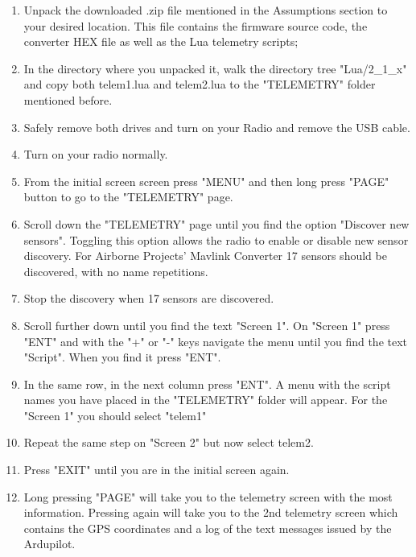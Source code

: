 \documentclass[english]{article}
\begin{document}
\begin{enumerate}
\item  Unpack the downloaded .zip file mentioned in the Assumptions section to your desired location. This file contains the firmware source code, the converter HEX file as well as the Lua telemetry scripts;

\item In the directory where you unpacked it, walk the directory tree "Lua/2\_1\_x" and copy both telem1.lua and telem2.lua to the "TELEMETRY" folder mentioned before.

\item Safely remove both drives and turn on your Radio and remove the USB cable.

\item Turn on your radio normally.

\item From the initial screen screen press "MENU" and then long press "PAGE" button to go to the "TELEMETRY" page.

\item Scroll down the "TELEMETRY" page until you find the option "Discover new sensors". Toggling this option allows the radio to enable or disable new sensor discovery. For Airborne Projects' Mavlink Converter 17 sensors should be discovered, with no name repetitions.

\item  Stop the discovery when 17 sensors are discovered.

\item Scroll further down until you find the text "Screen 1". On "Screen 1" press "ENT" and with the "+" or "-" keys navigate the menu until you find the text "Script". When you find it press "ENT".

\item In the same row, in the next column press "ENT". A menu with the script names you have placed in the "TELEMETRY" folder will appear. For the "Screen 1" you should select "telem1"

\item Repeat the same step on "Screen 2" but now select telem2.

\item Press "EXIT" until you are in the initial screen again.

\item Long pressing "PAGE" will take you to the telemetry screen with the most information. Pressing again will take you to the 2nd telemetry screen which contains the GPS coordinates and a log of the text messages issued by the Ardupilot.

\end{enumerate}
\end{document}
